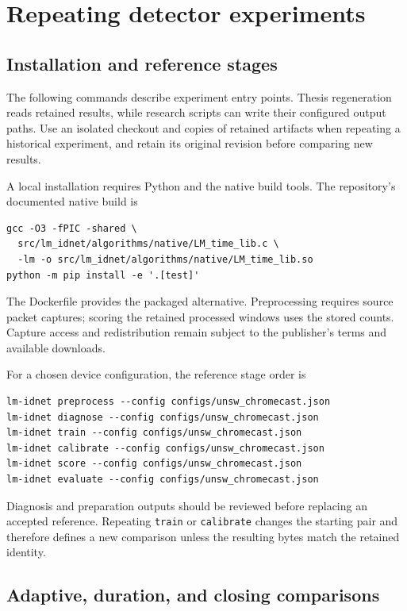 \section{Repeating detector experiments}
\label{app:experiment-commands}

\subsection{Installation and reference stages}

The following commands describe experiment entry points. Thesis regeneration
reads retained results, while research scripts can
write their configured output paths. Use an isolated checkout and
copies of retained artifacts when repeating a historical experiment,
and retain its original revision before comparing new results.

A local installation requires Python and the native build tools.
The repository's documented native build is
\begin{verbatim}
gcc -O3 -fPIC -shared \
  src/lm_idnet/algorithms/native/LM_time_lib.c \
  -lm -o src/lm_idnet/algorithms/native/LM_time_lib.so
python -m pip install -e '.[test]'
\end{verbatim}
The Dockerfile provides the packaged alternative. Preprocessing requires
source packet captures; scoring the retained processed windows uses the
stored counts. Capture access and redistribution
remain subject to the publisher's terms and available downloads.

For a chosen device configuration, the reference stage order is
\begin{verbatim}
lm-idnet preprocess --config configs/unsw_chromecast.json
lm-idnet diagnose --config configs/unsw_chromecast.json
lm-idnet train --config configs/unsw_chromecast.json
lm-idnet calibrate --config configs/unsw_chromecast.json
lm-idnet score --config configs/unsw_chromecast.json
lm-idnet evaluate --config configs/unsw_chromecast.json
\end{verbatim}
Diagnosis and preparation outputs should be reviewed before replacing
an accepted reference. Repeating \texttt{train} or \texttt{calibrate}
changes the starting pair and therefore defines a new comparison
unless the resulting bytes match the retained identity.

\subsection{Adaptive, duration, and closing comparisons}

